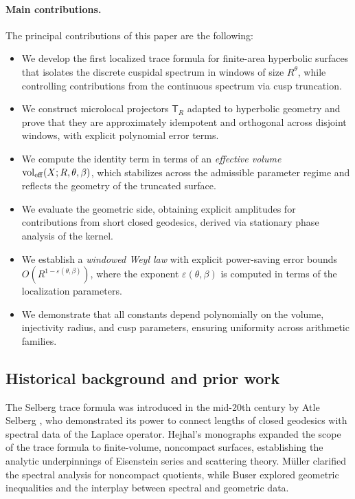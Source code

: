 \paragraph{Main contributions.}
The principal contributions of this paper are the following:
\begin{itemize}
  \item We develop the first localized trace formula for finite-area hyperbolic surfaces 
        that isolates the discrete cuspidal spectrum in windows of size $R^\theta$, while 
        controlling contributions from the continuous spectrum via cusp truncation.
  \item We construct microlocal projectors $\mathsf{T}_R$ adapted to hyperbolic geometry 
        and prove that they are approximately idempotent and orthogonal across disjoint 
        windows, with explicit polynomial error terms.
  \item We compute the identity term in terms of an \emph{effective volume} 
        $\operatorname{vol}_{\mathrm{eff}}(X;R,\theta,\beta)$, which stabilizes across the admissible 
        parameter regime and reflects the geometry of the truncated surface.
  \item We evaluate the geometric side, obtaining explicit amplitudes for contributions 
        from short closed geodesics, derived via stationary phase analysis of the kernel.
  \item We establish a \emph{windowed Weyl law} with explicit power-saving error bounds 
        $O(R^{1-\varepsilon(\theta,\beta)})$, where the exponent $\varepsilon(\theta,\beta)$ 
        is computed in terms of the localization parameters.
  \item We demonstrate that all constants depend polynomially on the volume, injectivity 
        radius, and cusp parameters, ensuring uniformity across arithmetic families.
\end{itemize}

\subsection{Historical background and prior work}\label{subsec:history}

The Selberg trace formula was introduced in the mid-20th century by Atle Selberg 
\cite{selberg1956}, who demonstrated its power to connect lengths of closed geodesics 
with spectral data of the Laplace operator. Hejhal’s monographs 
\cite{hejhal1976,hejhal1983} expanded the scope of the trace formula to finite-volume, 
noncompact surfaces, establishing the analytic underpinnings of Eisenstein series and 
scattering theory. Müller \cite{mueller1983} clarified the spectral analysis for 
noncompact quotients, while Buser \cite{buser1992} explored geometric inequalities and 
the interplay between spectral and geometric data.


